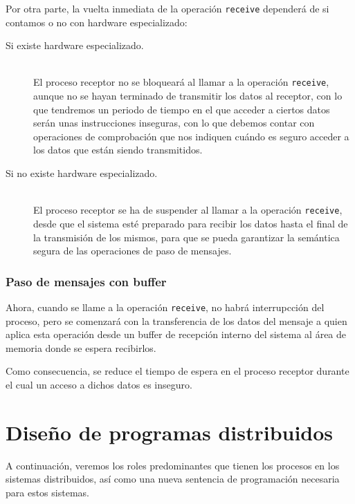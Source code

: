 Por otra parte, la vuelta inmediata de la operación \verb|receive| dependerá de si contamos o no con hardware especializado:
\begin{description}
    \item [Si existe hardware especializado.]~\\
        El proceso receptor no se bloqueará al llamar a la operación \verb|receive|, aunque no se hayan terminado de transmitir los datos al receptor, con lo que tendremos un periodo de tiempo en el que acceder a ciertos datos serán unas instrucciones inseguras, con lo que debemos contar con operaciones de comprobación que nos indiquen cuándo es seguro acceder a los datos que están siendo transmitidos.
    \item [Si no existe hardware especializado.]~\\
        El proceso receptor se ha de suspender al llamar a la operación \verb|receive|, desde que el sistema esté preparado para recibir los datos hasta el final de la transmisión de los mismos, para que se pueda garantizar la semántica segura de las operaciones de paso de mensajes.
\end{description}

\subsubsection{Paso de mensajes con buffer}
Ahora, cuando se llame a la operación \verb|receive|, no habrá interrupcción del proceso, pero se comenzará con la transferencia de los datos del mensaje a quien aplica esta operación desde un buffer de recepción interno del sistema al área de memoria donde se espera recibirlos.

Como consecuencia, se reduce el tiempo de espera en el proceso receptor durante el cual un acceso a dichos datos es inseguro.

\section{Diseño de programas distribuidos}
A continuación, veremos los roles predominantes que tienen los procesos en los sistemas distribuidos, así como una nueva sentencia de programación necesaria para estos sistemas.

